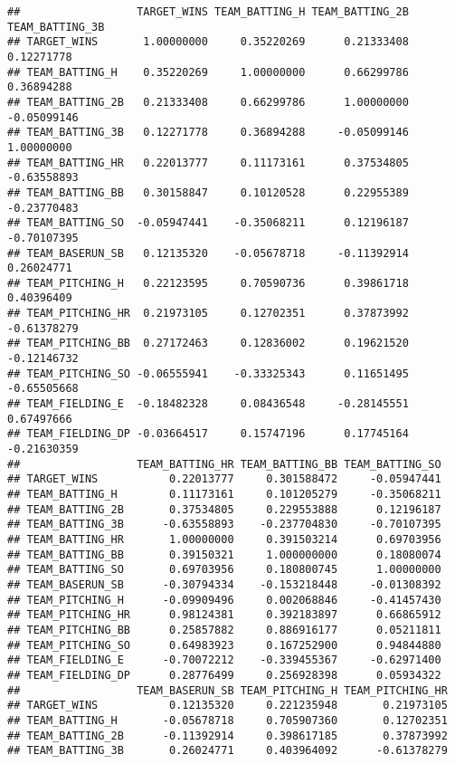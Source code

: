 \documentclass[
]{article}
\begin{document}
\begin{verbatim}
##                  TARGET_WINS TEAM_BATTING_H TEAM_BATTING_2B TEAM_BATTING_3B
## TARGET_WINS       1.00000000     0.35220269      0.21333408      0.12271778
## TEAM_BATTING_H    0.35220269     1.00000000      0.66299786      0.36894288
## TEAM_BATTING_2B   0.21333408     0.66299786      1.00000000     -0.05099146
## TEAM_BATTING_3B   0.12271778     0.36894288     -0.05099146      1.00000000
## TEAM_BATTING_HR   0.22013777     0.11173161      0.37534805     -0.63558893
## TEAM_BATTING_BB   0.30158847     0.10120528      0.22955389     -0.23770483
## TEAM_BATTING_SO  -0.05947441    -0.35068211      0.12196187     -0.70107395
## TEAM_BASERUN_SB   0.12135320    -0.05678718     -0.11392914      0.26024771
## TEAM_PITCHING_H   0.22123595     0.70590736      0.39861718      0.40396409
## TEAM_PITCHING_HR  0.21973105     0.12702351      0.37873992     -0.61378279
## TEAM_PITCHING_BB  0.27172463     0.12836002      0.19621520     -0.12146732
## TEAM_PITCHING_SO -0.06555941    -0.33325343      0.11651495     -0.65505668
## TEAM_FIELDING_E  -0.18482328     0.08436548     -0.28145551      0.67497666
## TEAM_FIELDING_DP -0.03664517     0.15747196      0.17745164     -0.21630359
##                  TEAM_BATTING_HR TEAM_BATTING_BB TEAM_BATTING_SO
## TARGET_WINS           0.22013777     0.301588472     -0.05947441
## TEAM_BATTING_H        0.11173161     0.101205279     -0.35068211
## TEAM_BATTING_2B       0.37534805     0.229553888      0.12196187
## TEAM_BATTING_3B      -0.63558893    -0.237704830     -0.70107395
## TEAM_BATTING_HR       1.00000000     0.391503214      0.69703956
## TEAM_BATTING_BB       0.39150321     1.000000000      0.18080074
## TEAM_BATTING_SO       0.69703956     0.180800745      1.00000000
## TEAM_BASERUN_SB      -0.30794334    -0.153218448     -0.01308392
## TEAM_PITCHING_H      -0.09909496     0.002068846     -0.41457430
## TEAM_PITCHING_HR      0.98124381     0.392183897      0.66865912
## TEAM_PITCHING_BB      0.25857882     0.886916177      0.05211811
## TEAM_PITCHING_SO      0.64983923     0.167252900      0.94844880
## TEAM_FIELDING_E      -0.70072212    -0.339455367     -0.62971400
## TEAM_FIELDING_DP      0.28776499     0.256928398      0.05934322
##                  TEAM_BASERUN_SB TEAM_PITCHING_H TEAM_PITCHING_HR
## TARGET_WINS           0.12135320     0.221235948       0.21973105
## TEAM_BATTING_H       -0.05678718     0.705907360       0.12702351
## TEAM_BATTING_2B      -0.11392914     0.398617185       0.37873992
## TEAM_BATTING_3B       0.26024771     0.403964092      -0.61378279

\end{verbatim}
\end{document}
